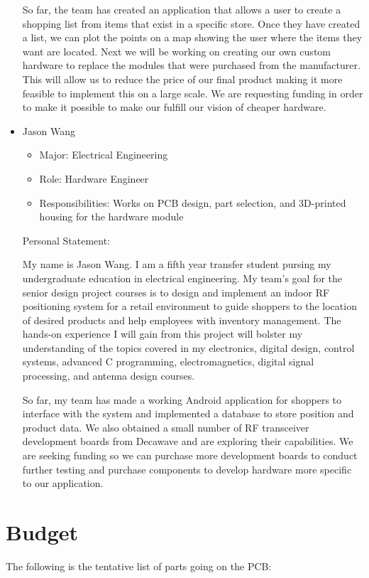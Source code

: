 \documentclass{article}
\begin{document}
\begin{itemize}
So far, the team has created an application that allows a user to create a shopping list from items that exist in a specific store. Once they have created a list, we can plot the points on a map showing the user where the items they want are located. Next we will be working on creating our own custom hardware to replace the modules that were purchased from the manufacturer. This will allow us to reduce the price of our final product making it more feasible to implement this on a large scale. We are requesting funding in order to make it possible to make our fulfill our vision of cheaper hardware.
\item Jason Wang
	\begin{itemize}
	\item Major: Electrical Engineering
	\item Role: Hardware Engineer
	\item Responsibilities: Works on PCB design, part selection, and 3D-printed housing for the hardware module
	\end{itemize}
Personal Statement:

My name is Jason Wang. I am a fifth year transfer student pursing my undergraduate education in electrical engineering. My team's goal for the senior design project courses is to design and implement an indoor RF positioning system for a retail environment to guide shoppers to the location of desired products and help employees with inventory management. The hands-on experience I will gain from this project will bolster my understanding of the topics covered in my electronics, digital design, control systems, advanced C programming, electromagnetics, digital signal processing, and antenna design courses. 

So far, my team has made a working Android application for shoppers to interface with the system and implemented a database to store position and product data. We also obtained a small number of RF transceiver development boards from Decawave and are exploring their capabilities. We are seeking funding so we can purchase more development boards to conduct further testing and purchase components to develop hardware more specific to our application.
\end{itemize}

\section{Budget}

The following is the tentative list of parts going on the PCB:
\end{document}
